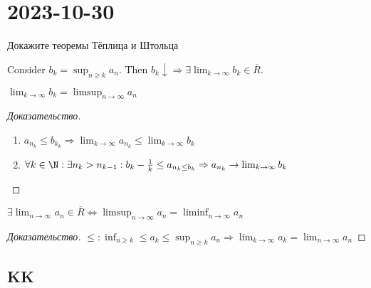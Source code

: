 \section{2023-10-30}

\begin{exercise}
	Докажите теоремы Тёплица и Штольца
\end{exercise}

Consider $b_k = \sup_{n \geq k} a_n$. Then $b_k \downarrow \Rightarrow \exists \lim_{k \to \infty} b_k \in \overline{R}$.

\begin{lemma}
	$\lim_{k \to \infty} b_k = \limsup_{n \to \infty} a_n$
\end{lemma}
\begin{proof}[Доказательство]
	\begin{enumerate}
		\item $a_{n_{k}} \leq b_{k_{k}} \Rightarrow \lim_{k \to \infty} a_{n_{k}} \leq \lim_{k \to \infty} b_k$
	\item $\forall k \in \N: \exists n_k > n_{k-1}: b_k - \frac{1}{k} \leq a_{n_{k} \leq b_k} \Rightarrow a_{n_{k}} \to \lim_{k \to \infty} b_k$ 
	\end{enumerate}
\end{proof}

\begin{theorem}
	$\exists \lim_{n \to \infty} a_n \in \overline{R} \Leftrightarrow \limsup_{n \to \infty} a_n = \liminf_{n \to \infty} a_n$
\end{theorem}

\begin{proof}[Доказательство]
	$ \leq: \inf_{n \geq k} \leq a_k \leq \sup_{n \geq k} a_n \Rightarrow \lim_{k \to \infty} a_k = \lim_{n \to \infty} a_n$
\end{proof}

\subsection{KK}

